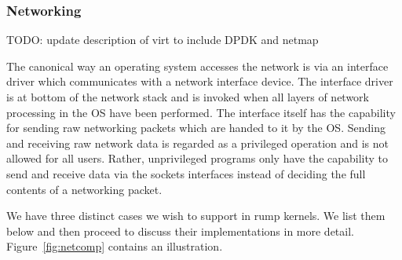 \subsubsection{Networking}
\label{sect:networking}

TODO: update description of virt to include DPDK and netmap

The canonical way an operating system accesses the network is via an
interface driver which communicates with a network interface device.
The interface driver is at bottom of the network stack and is invoked
when all layers of network processing in the OS have been performed.
The interface itself has the capability for sending raw networking
packets which are handed to it by the OS.  Sending and receiving raw
network data is regarded as a privileged operation and is not allowed
for all users.  Rather, unprivileged programs only have the capability
to send and receive data via the sockets interfaces instead of deciding
the full contents of a networking packet.

We have three distinct cases we wish to support in rump kernels.
We list them below and then proceed to discuss their implementations in
more detail.  Figure~\ref{fig:netcomp} contains an illustration.

